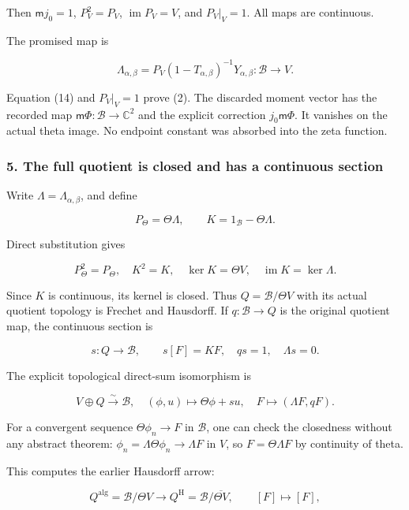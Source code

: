 Then \(\mathsf m j_0=1\), \(P_V^2=P_V\), \(\operatorname{im}P_V=V\), and \(P_V|_V=1\). All maps are
continuous.

The promised map is

\[\boxed{\Lambda_{\alpha,\beta}=P_V(1-T_{\alpha,\beta})^{-1}Y_{\alpha,\beta}:\mathscr B\to V.}\tag{16}\]

Equation (14) and \(P_V|_V=1\) prove (2). The discarded moment vector has the recorded map
\(\mathsf m\Phi:\mathscr B\to\mathbb C^2\) and the explicit correction \(j_0\mathsf m\Phi\). It
vanishes on the actual theta image. No endpoint constant was absorbed into the zeta function.

\subsubsection{5. The full quotient is closed and has a continuous
section}\label{pr_10:the-full-quotient-is-closed-and-has-a-continuous-section}

Write \(\Lambda=\Lambda_{\alpha,\beta}\), and define

\[P_\Theta=\Theta\Lambda,\qquad K=1_{\mathscr B}-\Theta\Lambda.\tag{17}\]

Direct substitution gives

\[P_\Theta^2=P_\Theta,\quad K^2=K,\quad
\ker K=\Theta V,\quad\operatorname{im}K=\ker\Lambda.\tag{18}\]

Since \(K\) is continuous, its kernel is closed. Thus \(Q=\mathscr B/\Theta V\) with its actual
quotient topology is Frechet and Hausdorff. If \(q:\mathscr B\to Q\) is the original quotient map,
the continuous section is

\[\boxed{s:Q\to\mathscr B,\qquad s[F]=KF,\quad qs=1,\quad\Lambda s=0.}\tag{19}\]

The explicit topological direct-sum isomorphism is

\[\boxed{V\oplus Q\xrightarrow{\sim}\mathscr B,
\quad(\phi,u)\mapsto\Theta\phi+su,
\quad F\mapsto(\Lambda F,qF).}\tag{20}\]

For a convergent sequence \(\Theta\phi_n\to F\) in \(\mathscr B\), one can check the closedness
without any abstract theorem: \(\phi_n=\Lambda\Theta\phi_n\to\Lambda F\) in \(V\), so
\(F=\Theta\Lambda F\) by continuity of theta.

This computes the earlier Hausdorff arrow:

\[Q^{\mathrm{alg}}=\mathscr B/\Theta V\longrightarrow
Q^{\mathrm H}=\mathscr B/\overline{\Theta V},\qquad[F]\mapsto[F],\tag{21}\]

